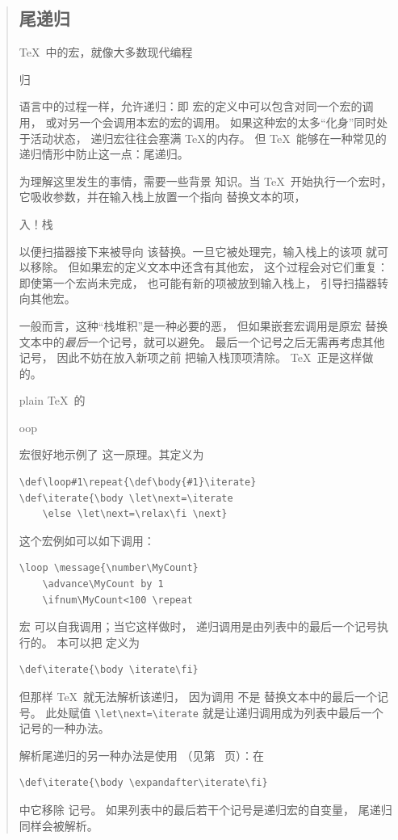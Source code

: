 \documentclass[a4paper]{rapport3}
\makeatletter
\newenvironment{disp}{\begin{quotation}}{\end{quotation}}
\def\term#1\par{\index{#1}}
\def\cstoidx#1\par{\index{#1@\cs{#1}}}
\def\csidx#1{\cstoidx #1\par\cs{#1}}
\makeatother
\begin{document}
\begin{disp}
\subsection{尾递归}

\TeX\ 中的宏，就像大多数现代编程
\term 递归\par
语言中的过程一样，允许递归：即
宏的定义中可以包含对同一个宏的调用，
或对另一个会调用本宏的宏的调用。
如果这种宏的太多“化身”同时处于活动状态，
递归宏往往会塞满 \TeX 的内存。
但 \TeX\ 能够在一种常见的递归情形中防止这一点：尾递归。

为理解这里发生的事情，需要一些背景
知识。当 \TeX\ 开始执行一个宏时，
它吸收参数，并在输入栈上放置一个指向
替换文本的项，
\term 输入！栈\par
以便扫描器接下来被导向
该替换。一旦它被处理完，输入栈上的该项
就可以移除。
但如果宏的定义文本中还含有其他宏，
这个过程会对它们重复：即使第一个宏尚未完成，
也可能有新的项被放到输入栈上，
引导扫描器转向其他宏。

一般而言，这种“栈堆积”是一种必要的恶，
但如果嵌套宏调用是原宏
替换文本中的{\em 最后\/}一个记号，就可以避免。
最后一个记号之后无需再考虑其他记号，
因此不妨在放入新项之前
把输入栈顶项清除。
\TeX\ 正是这样做的。

plain \TeX\ 的 \csidx{loop} 宏很好地示例了
\label{loop:ex}
这一原理。其定义为
\begin{verbatim}
\def\loop#1\repeat{\def\body{#1}\iterate}
\def\iterate{\body \let\next=\iterate
    \else \let\next=\relax\fi \next}
\end{verbatim}
这个宏例如可以如下调用：
\begin{verbatim}
\loop \message{\number\MyCount}
    \advance\MyCount by 1
    \ifnum\MyCount<100 \repeat
\end{verbatim}
宏  可以自我调用；当它这样做时，
递归调用是由列表中的最后一个记号执行的。
本可以把  定义为 \begin{verbatim}
\def\iterate{\body \iterate\fi}
\end{verbatim}
但那样 \TeX\ 就无法解析该递归，
因为调用  不是  替换文本中的最后一个记号。
此处赋值 \verb>\let\next=\iterate>
就是让递归调用成为列表中最后一个记号的一种办法。

解析尾递归的另一种办法是使用
（见第~\pageref{after:cond} 页）：在
\begin{verbatim}
\def\iterate{\body \expandafter\iterate\fi}
\end{verbatim}
中它移除  记号。
如果列表中的最后若干个记号是递归宏的自变量，
尾递归同样会被解析。


\end{disp}
\end{document}
